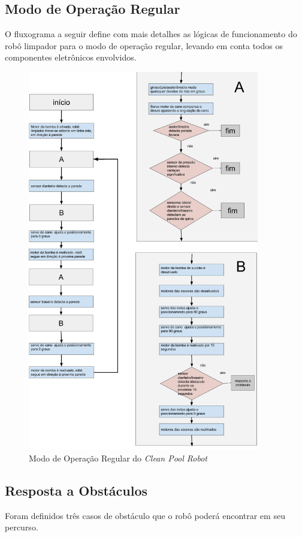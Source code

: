 \subsection{Modo de Operação Regular}
O fluxograma a seguir define com mais detalhes as lógicas de funcionamento
do robô limpador para o modo de operação regular, levando em conta todos os
componentes eletrônicos envolvidos.
\par
\begin{figure}[h]
  \centering
  \includegraphics[width=0.9\textwidth]{figures/flow-regular-robot.jpg}
  \caption{Modo de Operação Regular do \textit{Clean Pool Robot}}
  \label{fig:schema-way-robot}
\end{figure}
\FloatBarrier

\subsection{Resposta a Obstáculos}
Foram definidos três casos de obstáculo que o robô poderá encontrar em seu percurso.


